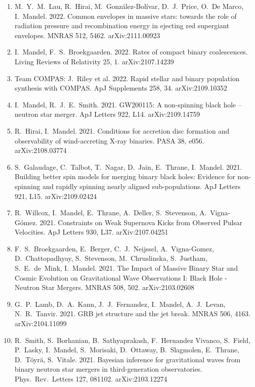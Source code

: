 \documentclass[margin,line]{res}
\begin{document}
\begin{resume}
\begin{enumerate}
\item M.~Y.~M.~Lau, R.~Hirai, M.~Gonz\'alez-Bol\'ivar, D.~J.~Price, O.~De Marco, I.~Mandel. 2022. Common envelopes in massive stars: towards the role of radiation pressure and recombination energy in ejecting red supergiant envelopes. MNRAS 512, 5462.  arXiv:2111.00923

\item I.~Mandel, F.~S.~Broekgaarden. 2022. Rates of compact binary coalescences.  Living Reviews of Relativity 25, 1.  arXiv:2107.14239

\item Team COMPAS: J.~Riley et al. 2022.  Rapid stellar and binary population synthesis with COMPAS.  ApJ Supplements 258, 34.  arXiv:2109.10352

\item I.~Mandel, R.~J.~E.~Smith.  2021.  GW200115: A non-spinning black hole -- neutron star merger.  ApJ Letters 922, L14. arXiv:2109.14759

\item R.~Hirai, I.~Mandel. 2021. Conditions for accretion disc formation and observability of wind-accreting X-ray binaries. PASA 38, e056.  arXiv:2108.03774 

\item S.~Galaudage, C.~Talbot, T.~Nagar, D.~Jain, E.~Thrane, I.~Mandel.  2021. Building better spin models for merging binary black holes: Evidence for non-spinning and rapidly spinning nearly aligned sub-populations. ApJ Letters 921, L15.  arXiv:2109.02424

\item R.~Willcox, I.~Mandel, E.~Thrane, A.~Deller, S.~Stevenson, A.~Vigna-G{\'o}mez.  2021. Constraints on Weak Supernova Kicks from Observed Pulsar Velocities.  ApJ Letters 930, L37.  arXiv:2107.04251 

\item F.~S.~Broekgaarden, E.~Berger, C.~J.~Neijssel, A.~Vigna-Gomez, D.~Chattopadhyay, S.~Stevenson, M.~Chruslinska, S.~Justham, S.~E.~de~Mink, I.~Mandel. 2021. The Impact of Massive Binary Star and Cosmic Evolution on Gravitational Wave Observations I: Black Hole - Neutron Star Mergers.  MNRAS 508, 502. arXiv:2103.02608

\item G.~P.~Lamb, D.~A.~Kann, J.~J.~Fernandez, I.~Mandel, A.~J.~Levan, N.~R.~Tanvir. 2021. GRB jet structure and the jet break. MNRAS 506, 4163.  arXiv:2104.11099

\item R.~Smith, S.~Borhanian, B.~Sathyaprakash, F.~Hernandez Vivanco, S.~Field, P.~Lasky, I.~Mandel, S.~Morisaki, D.~Ottaway, B.~Slagmolen, E.~Thrane, D.~T\"{o}yr\"{a}, S.~Vitale.  2021.  Bayesian inference for gravitational waves from binary neutron star mergers in third-generation observatories.  Phys.~Rev.~Letters 127, 081102. arXiv:2103.12274


\end{enumerate}
\end{resume}
\end{document}
